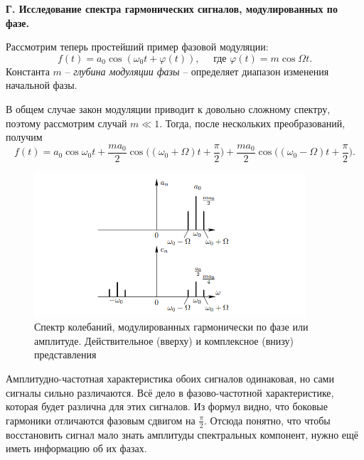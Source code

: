 \documentclass[a4paper,12pt]{article}
\begin{document}
\textbf{Г. Исследование спектра гармонических сигналов, модулированных по фазе.}

Рассмотрим теперь простейший пример фазовой модуляции:
\[f(t) = a_0 \cos(\omega_0 t + \varphi (t)), \quad \text{ где } \varphi (t) = m \cos \Omega t.\]
Константа $m$ -- \textit{глубина модуляции фазы} -- определяет диапазон
изменения начальной фазы.

В общем случае закон модуляции приводит к довольно сложному спектру, поэтому рассмотрим случай $m \ll 1$. Тогда, после нескольких преобразований, получим
\[f(t) = a_0 \cos \omega_0 t + \frac{m a_0}{2} \cos\bigg((\omega_0 + \Omega) t + \frac{\pi}{2}\bigg) + \frac{m a_0}{2} \cos\bigg((\omega_0 - \Omega) t + \frac{\pi}{2}\bigg).\]
\begin{figure}[H]\label{fig: Amplitude and phase modul spektr}
    \centering
    \includegraphics[width = 0.9\textwidth]{Амплитудно и фазо-модулированный спектр.png}
    \caption{Спектр колебаний, модулированных гармонически по фазе или амплитуде. Действительное (вверху) и комплексное (внизу) представления}
\end{figure}

Амплитудно-частотная характеристика обоих сигналов одинаковая, но сами сигналы сильно различаются. Всё дело в фазово-частотной характеристике, которая будет различна для этих сигналов. Из формул видно, что боковые гармоники отличаются фазовым сдвигом на $\frac{\pi}{2}$. Отсюда понятно, что чтобы восстановить сигнал мало знать амплитуды спектральных компонент, нужно  ещё иметь информацию об их фазах.
\end{document}
